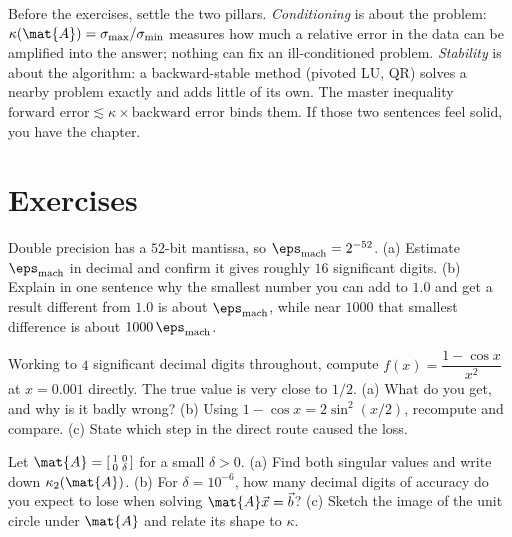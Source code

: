 \begin{recoverybox}
Before the exercises, settle the two pillars. \emph{Conditioning} is about the problem:
$\kappa(\mat{A})=\sigma_{\max}/\sigma_{\min}$ measures how much a relative error in the
data can be amplified into the answer; nothing can fix an ill-conditioned problem.
\emph{Stability} is about the algorithm: a backward-stable method (pivoted LU, QR)
solves a nearby problem exactly and adds little of its own. The master inequality
$\text{forward error}\lesssim\kappa\times\text{backward error}$ binds them. If those two
sentences feel solid, you have the chapter.
\end{recoverybox}

\section{Exercises}

\begin{exercise}
Double precision has a $52$-bit mantissa, so $\eps_{\text{mach}}=2^{-52}$. (a) Estimate
$\eps_{\text{mach}}$ in decimal and confirm it gives roughly $16$ significant digits.
(b) Explain in one sentence why the smallest number you can add to $1.0$ and get a
result different from $1.0$ is about $\eps_{\text{mach}}$, while near $1000$ that
smallest difference is about $1000\,\eps_{\text{mach}}$.
\end{exercise}

\begin{exercise}
Working to $4$ significant decimal digits throughout, compute $f(x)=\dfrac{1-\cos x}
{x^2}$ at $x=0.001$ directly. The true value is very close to $1/2$. (a) What do you
get, and why is it badly wrong? (b) Using $1-\cos x = 2\sin^2(x/2)$, recompute and
compare. (c) State which step in the direct route caused the loss.
\end{exercise}

\begin{exercise}
Let $\mat{A}=\left[\begin{smallmatrix}1 & 0\\ 0 & \delta\end{smallmatrix}\right]$ for a
small $\delta>0$. (a) Find both singular values and write down $\kappa_2(\mat{A})$. (b)
For $\delta=10^{-6}$, how many decimal digits of accuracy do you expect to lose when
solving $\mat{A}\vec{x}=\vec{b}$? (c) Sketch the image of the unit circle under
$\mat{A}$ and relate its shape to $\kappa$.
\end{exercise}

